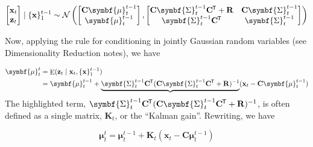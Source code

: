 \documentclass[11pt]{article}
\DeclareMathOperator{\E}{E}
\newcommand{\xb}{\mathbf{x}}
\newcommand{\zb}{\mathbf{z}}
\newcommand{\ub}{\symbf{\mu}}
\newcommand{\Sb}{\symbf{\Sigma}}
\newcommand{\Cb}{\mathbf{C}}
\newcommand{\Rb}{\mathbf{R}}
\newcommand*{\tran}{^{\mkern-1.5mu\mathsf{T}}}
\begin{document}
\begin{equation*}
  \begin{bmatrix}\xb_t \\ \zb_t\end{bmatrix} \mid \{\xb\}_1^{t-1} \sim
    \mathcal{N}\left( \begin{bmatrix}\Cb \ub_t^{t-1} \\ \ub_t^{t-1}\end{bmatrix},
      \begin{bmatrix}\Cb \Sb_t^{t-1} \Cb\tran + \Rb & \Cb \Sb_t^{t-1} \\
                     \Sb_t^{t-1} \Cb\tran &
                     \Sb_t^{t-1}\end{bmatrix}
    \right)
\end{equation*}

Now, applying the rule for conditioning in jointly Gaussian random variables
(see Dimensionality Reduction notes), we have

\begin{align*}
  \ub_t^t &= \E(\zb_t \mid \xb_t, \{\xb\}_1^{t-1}) \\
      &= \ub_t^{t-1} + \underbrace{\Sb_t^{t-1} \Cb\tran
          (\Cb \Sb_t^{t-1} \Cb\tran + \Rb)^{-1}}
          (\xb_t - \Cb \ub_t^{t-1})
\end{align*}
The highlighted term, $\Sb_t^{t-1} \Cb\tran (\Cb \Sb_t^{t-1} \Cb\tran + \Rb)^{-1}$,
is often defined as a single matrix, $\mathbf{K}_t$, or the ``Kalman gain''.
Rewriting, we have
\begin{framed}
  \begin{equation}
    \ub_t^t = \ub_t^{t-1} + \mathbf{K}_t (\xb_t - \Cb \ub_t^{t-1})
  \end{equation}
\end{framed}
\end{document}
